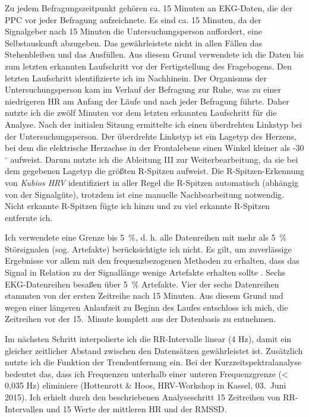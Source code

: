 Zu jedem Befragungszeitpunkt gehören ca. 15 Minuten an \ac{EKG}-Daten, die der \ac{PPC} vor jeder Befragung aufzeichnete. Es sind ca. 15 Minuten, da der Signalgeber nach 15 Minuten die Untersuchungsperson auffordert, eine Selbstauskunft abzugeben. Das gewährleistete nicht in allen Fällen das Stehenbleiben und das Ausfüllen. Aus diesem Grund verwendete ich die Daten bis zum letzten erkannten Laufschritt vor der Fertigstellung des Fragebogens. Den letzten Laufschritt identifizierte ich im Nachhinein. Der Organismus der Untersuchungsperson kam im Verlauf der Befragung zur Ruhe, was zu einer niedrigeren \ac{HR} am Anfang der Läufe und nach jeder Befragung führte. Daher nutzte ich die zwölf Minuten vor dem letzten erkannten Laufschritt für die Analyse. Nach der initialen Sitzung ermittelte ich einen überdrehten Linkstyp bei der Untersuchungsperson. Der überdrehte Linkstyp ist ein Lagetyp des Herzens, bei dem die elektrische Herzachse in der Frontalebene einen Winkel kleiner als -30 $^{\circ}$ aufweist. Darum nutzte ich die Ableitung III zur Weiterbearbeitung, da sie bei dem gegebenen Lagetyp die größten R-Spitzen aufweist. Die R-Spitzen-Erkennung von \emph{Kubios HRV} identifiziert in aller Regel die R-Spitzen automatisch (abhängig von der Signalgüte), trotzdem ist eine manuelle Nachbearbeitung notwendig. Nicht erkannte R-Spitzen fügte ich hinzu und zu viel erkannte R-Spitzen entfernte ich.

Ich verwendete eine Grenze bis 5~\%, d. h. alle Datenreihen mit mehr als 5~\% Störsignalen (sog. Artefakte) berücksichtigte ich nicht. Es gilt, um zuverlässige Ergebnisse vor allem mit den frequenzbezogenen Methoden zu erhalten, dass das Signal in Relation zu der Signallänge wenige Artefakte erhalten sollte \citep[z.~B. < 5 - 10~\%; vgl. ][S.~77]{Sammito2015}. Sechs \ac{EKG}-Datenreihen besaßen über 5~\% Artefakte. Vier der sechs Datenreihen stammten von der ersten Zeitreihe nach 15 Minuten. Aus diesem Grund und wegen einer längeren Anlaufzeit zu Beginn des Laufes entschloss ich mich, die Zeitreihen vor der 15.~Minute komplett aus der Datenbasis zu entnehmen.

Im nächsten Schritt interpolierte ich die RR-Intervalle linear (4 Hz), damit ein gleicher zeitlicher Abstand zwischen den Datensätzen gewährleistet ist. Zusätzlich nutzte ich die Funktion der Trendentfernung ein. Bei der Kurzzeitspektralanalyse bedeutet das, dass ich Frequenzen unterhalb einer unteren Frequenzgrenze (< 0,035 Hz) eliminiere (Hottenrott \& Hoos, \ac{HRV}-Workshop in Kassel, 03.~Juni 2015). Ich erhielt durch den beschriebenen Analyseschritt 15 Zeitreihen von RR-Intervallen und 15 Werte der mittleren \ac{HR} und der \acs{RMSSD}.

